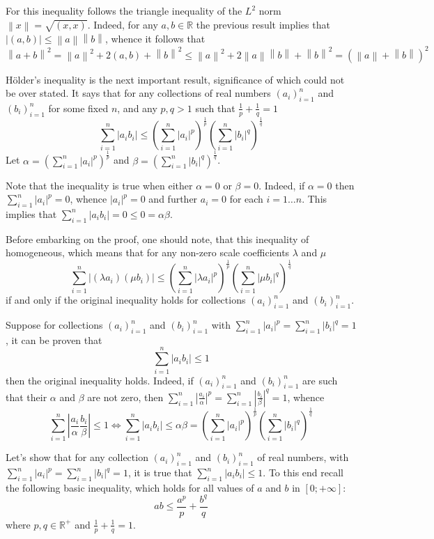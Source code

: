 \documentclass[a4paper]{article}
\newcommand{\brac}[1]{{\left({#1}\right)}}
\newcommand{\abs}[1]{\left | {#1}\right |}
\newcommand{\nrm}[1]{\left\| #1 \right \|}
\begin{document}
For this inequality follows the triangle inequality of the $L^2$ norm $\nrm{x} = \sqrt{\brac{x, x}}$. Indeed, for any $a, b \in \mathbb{R}$ the previous result implies that $\abs{\brac{a,b}} \leq \nrm{a}\nrm{b}$, whence it follows that \[\nrm{a+b}^2 = \nrm{a}^2 + 2\brac{a,b} + \nrm{b}^2 \leq \nrm{a}^2 + 2 \nrm{a}\nrm{b} + \nrm{b}^2 = \brac{\nrm{a} + \nrm{b}}^2\]

H\"older's inequality is the next important result, significance of which could not be over stated. It says that for any collections of real numbers $\brac{a_i}_{i=1}^n$ and $\brac{b_i}_{i=1}^n$ for some fixed $n$, and any $p,q>1$ such that $\frac{1}{p}+\frac{1}{q}=1$ \[\sum_{i=1}^n \abs{a_i b_i}\leq \brac{\sum_{i=1}^n \abs{a_i}^p}^{\frac{1}{p}}\brac{\sum_{i=1}^n \abs{b_i}^q}^{\frac{1}{q}}\] Let $\alpha  = \brac{\sum_{i=1}^n \abs{a_i}^p}^\frac{1}{p}$ and $\beta = \brac{\sum_{i=1}^n \abs{b_i}^q}^\frac{1}{q}$.

Note that the inequality is true when either $\alpha = 0$ or $\beta = 0$. Indeed, if $\alpha = 0$ then $\sum_{i=1}^n \abs{a_i}^p = 0$, whence $\abs{a_i}^p = 0$ and further $a_i = 0$ for each $i=1 \ldots n$. This implies that $\sum_{i=1}^n \abs{a_i b_i} = 0 \leq 0 = \alpha \beta$.

Before embarking on the proof, one should note, that this inequality of homogeneous, which means that for any non-zero scale coefficients $\lambda$ and $\mu$ \[\sum_{i=1}^n \abs{(\lambda a_i) (\mu b_i)} \leq \brac{\sum_{i=1}^n \abs{\lambda a_i}^p}^{\frac{1}{p}} \brac{\sum_{i=1}^n \abs{\mu b_i}^q}^{\frac{1}{q}}\] if and only if the original inequality holds for collections $\brac{a_i}_{i=1}^n$ and $\brac{b_i}_{i=1}^n$.

Suppose for collections $\brac{a_i}_{i=1}^n$ and $\brac{b_i}_{i=1}^n$ with $\sum_{i=1}^n \abs{a_i}^p=\sum_{i=1}^n \abs{b_i}^q=1$, it can be proven that \[\sum_{i=1}^n \abs{a_i b_i} \leq 1\] then the original inequality holds. Indeed, if $\brac{a_i}_{i=1}^n$ and $\brac{b_i}_{i=1}^n$ are such that their $\alpha$ and $\beta$ are not zero, then $\sum_{i=1}^n \abs{\frac{a_i}{\alpha}}^p = \sum_{i=1}^n \abs{\frac{b_i}{\beta}}^q = 1$, whence \[\sum_{i=1}^n \abs{\frac{a_i}{\alpha} \frac{b_i}{\beta}} \leq 1 \Leftrightarrow \sum_{i=1}^n \abs{a_i b_i} \leq \alpha \beta = \brac{\sum_{i=1}^n \abs{a_i}^p}^\frac{1}{p} \brac{\sum_{i=1}^n \abs{b_i}^q}^\frac{1}{q}\]

Let's show that for any collection $\brac{a_i}_{i=1}^n$ and $\brac{b_i}_{i=1}^n$ of real numbers, with $\sum_{i=1}^n \abs{a_i}^p=\sum_{i=1}^n \abs{b_i}^q=1$, it is true that $\sum_{i=1}^n \abs{a_i b_i} \leq 1$. To this end recall the following basic inequality, which holds for all values of $a$ and $b$ in $\left [ 0; +\infty \right ]$: \[a b \leq \frac{a^p}{p} + \frac{b^q}{q}\] where $p, q \in \mathbb{R}^+$ and $\frac{1}{p}+\frac{1}{q}=1$.
\end{document}
